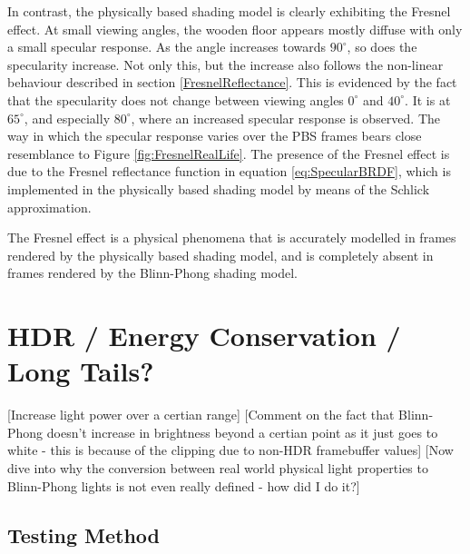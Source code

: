 In contrast, the physically based shading model is clearly exhibiting the Fresnel effect. At small viewing angles, the wooden floor appears mostly diffuse with only a small specular response. As the angle increases towards \begin{math}90^{\circ}\end{math}, so does the specularity increase. Not only this, but the increase also follows the non-linear behaviour described in section \ref{FresnelReflectance}. This is evidenced by the fact that the specularity does not change between viewing angles \begin{math}0^{\circ}\end{math} and \begin{math}40^{\circ}\end{math}. It is at \begin{math}65^{\circ}\end{math}, and especially \begin{math}80^{\circ}\end{math}, where an increased specular response is observed. The way in which the specular response varies over the PBS frames bears close resemblance to Figure \ref{fig:FresnelRealLife}. The presence of the Fresnel effect is due to the Fresnel reflectance function in equation \ref{eq:SpecularBRDF}, which is implemented in the physically based shading model by means of the Schlick approximation.

The Fresnel effect is a physical phenomena that is accurately modelled in frames rendered by the physically based shading model, and is completely absent in frames rendered by the Blinn-Phong shading model.

\section{HDR / Energy Conservation / Long Tails?}

[Increase light power over a certian range]
[Comment on the fact that Blinn-Phong doesn't increase in brightness beyond a certian point as it just goes to white - this is because of the clipping due to non-HDR framebuffer values]
[Now dive into why the conversion between real world physical light properties to Blinn-Phong lights is not even really defined - how did I do it?]

\subsection{Testing Method}

